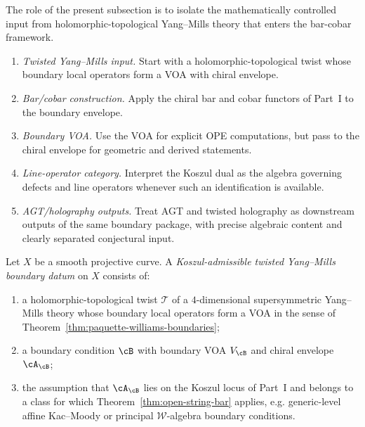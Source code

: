 \begin{summary}[Programme]
The role of the present subsection is to isolate the mathematically controlled input from
holomorphic-topological Yang--Mills theory that enters the bar-cobar framework.

\begin{enumerate}[label=(\roman*)]
\item \emph{Twisted Yang--Mills input.}  Start with a holomorphic-topological twist whose
boundary local operators form a VOA with chiral envelope.
\item \emph{Bar/cobar construction.}  Apply the chiral bar and cobar functors of Part~I to the
boundary envelope.
\item \emph{Boundary VOA.}  Use the VOA for explicit OPE computations, but pass to the chiral
envelope for geometric and derived statements.
\item \emph{Line-operator category.}  Interpret the Koszul dual as the algebra governing defects
and line operators whenever such an identification is available.
\item \emph{AGT/holography outputs.}  Treat AGT and twisted holography as downstream outputs of
the same boundary package, with precise algebraic content and clearly separated conjectural input.
\end{enumerate}
\end{summary}

\begin{definition}
\label{def:twisted-ym-boundary-datum}
Let $X$ be a smooth projective curve.  A \emph{Koszul-admissible twisted Yang--Mills boundary datum}
on $X$ consists of:
\begin{enumerate}[label=(\roman*)]
\item a holomorphic-topological twist $\mathcal{T}$ of a $4$-dimensional supersymmetric
Yang--Mills theory whose boundary local operators form a VOA in the sense of
Theorem~\ref{thm:paquette-williams-boundaries};
\item a boundary condition $\cB$ with boundary VOA $V_{\cB}$ and chiral envelope $\cA_{\cB}$;
\item the assumption that $\cA_{\cB}$ lies on the Koszul locus of Part~I and belongs to a class
for which Theorem~\ref{thm:open-string-bar} applies, e.g. generic-level affine
Kac--Moody or principal $\mathcal{W}$-algebra boundary conditions.
\end{enumerate}
\end{definition}

